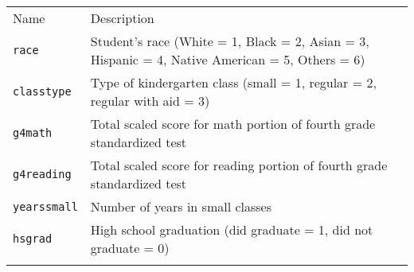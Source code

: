 \documentclass[]{article}
\begin{document}
\begin{longtable}[c]{@{}ll@{}}
\toprule\addlinespace
\begin{minipage}[b]{0.25\columnwidth}\raggedright
Name
\end{minipage} & \begin{minipage}[b]{0.68\columnwidth}\raggedright
Description
\end{minipage}
\\\addlinespace
\midrule\endhead
\begin{minipage}[t]{0.25\columnwidth}\raggedright
\texttt{race}
\end{minipage} & \begin{minipage}[t]{0.68\columnwidth}\raggedright
Student's race (White = 1, Black = 2, Asian = 3, Hispanic = 4, Native
American = 5, Others = 6)
\end{minipage}
\\\addlinespace
\begin{minipage}[t]{0.25\columnwidth}\raggedright
\texttt{classtype}
\end{minipage} & \begin{minipage}[t]{0.68\columnwidth}\raggedright
Type of kindergarten class (small = 1, regular = 2, regular with aid =
3)
\end{minipage}
\\\addlinespace
\begin{minipage}[t]{0.25\columnwidth}\raggedright
\texttt{g4math}
\end{minipage} & \begin{minipage}[t]{0.68\columnwidth}\raggedright
Total scaled score for math portion of fourth grade standardized test
\end{minipage}
\\\addlinespace
\begin{minipage}[t]{0.25\columnwidth}\raggedright
\texttt{g4reading}
\end{minipage} & \begin{minipage}[t]{0.68\columnwidth}\raggedright
Total scaled score for reading portion of fourth grade standardized test
\end{minipage}
\\\addlinespace
\begin{minipage}[t]{0.25\columnwidth}\raggedright
\texttt{yearssmall}
\end{minipage} & \begin{minipage}[t]{0.68\columnwidth}\raggedright
Number of years in small classes
\end{minipage}
\\\addlinespace
\begin{minipage}[t]{0.25\columnwidth}\raggedright
\texttt{hsgrad}
\end{minipage} & \begin{minipage}[t]{0.68\columnwidth}\raggedright
High school graduation (did graduate = 1, did not graduate = 0)
\end{minipage}
\\\addlinespace
\bottomrule
\end{longtable}
\end{document}

